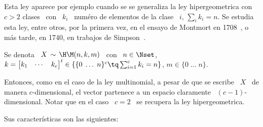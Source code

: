 \label{Sssec:MP:HipergeometricaMultivariada}

Esta ley aparece por ejemplo cuando  se se generaliza la ley hipergeometrica con
$c > 2$ clases \ con \ $k_i$  \ num\'ero de elementos de la clase \ $i$, $\sum_i
k_i = n$.  Se estudia esta ley, entre otros, por la primera vez, en el ensayo de
Montmort  en  1708~\cite{Mon13},  o  m\'as   tarde,  en  1740,  en  trabajos  de
Simpson~\cite{Sim40, Hal90}.

Se denota \ $X \, \sim \, \H\M(n,k,m)$ \ con \ $\displaystyle n \in \Nset$, \quad
$k = \begin{bmatrix} k_1 & \cdots & k_c\end{bmatrix}^t \in \left\{ \{ 0 \; \ldots
  \; n\}^c  \tq \sum_{i=1}^c k_i  = n \right\}$,  \quad $m \in  \{ 0 \;  \ldots \;
n\}$.

Entonces, como en el caso de la ley multinomial, a pesar de que se escribe \ $X$
\  de manera  $c$-dimensional, el  vector partenece  a un  espacio  claramente \
$(c-1)$-dimensional.  Notar que  en el  caso \  $c  = 2$  \ se  recupera la  ley
hipergeometrica.

Sus caracter\'isticas son las siguientes:

